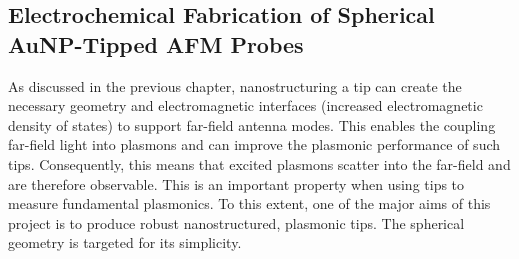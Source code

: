 \documentclass[12pt, a4paper, twoside]{book}
\begin{document}
\begin{singlespace}
\chapter{Electrochemical Fabrication of Spherical AuNP-Tipped AFM Probes}
\end{singlespace}


As discussed in the previous chapter, nanostructuring a tip can create the necessary geometry and electromagnetic interfaces {\color{red}(increased electromagnetic density of states)} to support far-field antenna modes. This enables the coupling far-field light into plasmons and can improve the plasmonic performance of such tips. Consequently, this means that excited plasmons scatter into the far-field and are therefore observable. This is an important property when using tips to measure fundamental plasmonics. To this extent, one of the major aims of this project is to produce robust nanostructured, plasmonic tips. The spherical geometry is targeted for its simplicity.
\end{document}
